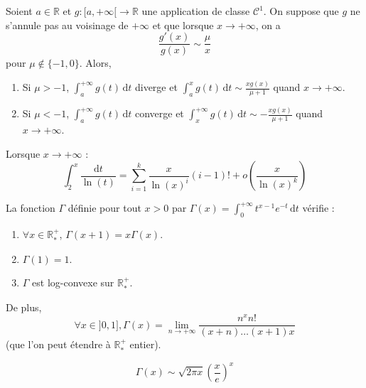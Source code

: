   \begin{application}
    Soient $a \in \mathbb{R}$ et $g : [a, +\infty[ \rightarrow \mathbb{R}$ une application de classe $\mathcal{C}^1$. On suppose que $g$ ne s'annule pas au voisinage de $+\infty$ et que lorsque $x \rightarrow +\infty$, on a
    \[ \frac{g'(x)}{g(x)} \sim \frac{\mu}{x} \]
    pour $\mu \notin \{ -1, 0 \}$. Alors,
    \begin{enumerate}[label=(\roman*)]
      \item Si $\mu > -1$, $\int_a^{+\infty} g(t) \, \mathrm{d}t$ diverge et $\int_a^x g(t) \, \mathrm{d}t \sim \frac{xg(x)}{\mu + 1}$ quand $x \rightarrow +\infty$.
      \item Si $\mu < -1$, $\int_a^{+\infty} g(t) \, \mathrm{d}t$ converge et $\int_x^{+\infty} g(t) \, \mathrm{d}t \sim -\frac{xg(x)}{\mu + 1}$ quand $x \rightarrow +\infty$.
    \end{enumerate}
  \end{application}


  \begin{example}
    Lorsque $x \rightarrow +\infty$ :
    \[ \int_{2}^{x} \frac{\mathrm{d}t}{\ln(t)} = \sum_{i=1}^k \frac{x}{\ln(x)^i} (i-1)! + o \left( \frac{x}{\ln(x)^k} \right) \]
  \end{example}


  \begin{proposition}
    La fonction $\Gamma$ définie pour tout $x > 0$ par $\Gamma(x) = \int_0^{+\infty} t^{x-1} e^{-t} \, \mathrm{d}t$ vérifie :
    \begin{enumerate}[label=(\roman*)]
      \item $\forall x \in \mathbb{R}^+_*$, $\Gamma(x+1) = x\Gamma(x)$.
      \item $\Gamma(1) = 1$.
      \item $\Gamma$ est log-convexe sur $\mathbb{R}^+_*$.
    \end{enumerate}
    De plus,
    \[ \forall x \in ]0, 1], \Gamma(x) = \lim_{n \rightarrow +\infty} \frac{n^x n!}{(x+n) \dots (x+1)x} \]
    (que l'on peut étendre à $\mathbb{R}^+_*$ entier).
  \end{proposition}


  \begin{theorem}
    \[ \Gamma(x) \sim \sqrt{2\pi x} \left( \frac{x}{e} \right)^x \]
  \end{theorem}

